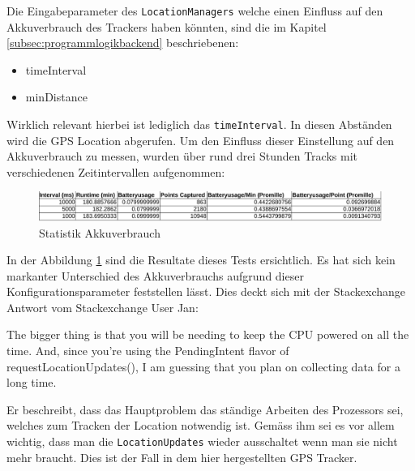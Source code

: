 Die Eingabeparameter des \lstinline$LocationManagers$ welche einen Einfluss auf den Akkuverbrauch des Trackers haben könnten, sind die im Kapitel \ref{subsec:programmlogikbackend} beschriebenen:
\begin{itemize}
	\item timeInterval
	\item minDistance
\end{itemize}

Wirklich relevant hierbei ist lediglich das \lstinline$timeInterval$. In diesen Abständen wird die GPS Location abgerufen. Um den Einfluss dieser Einstellung auf den Akkuverbrauch zu messen, wurden über rund drei Stunden Tracks mit verschiedenen Zeitintervallen aufgenommen:

\begin{figure}[h]
  \centering
  \includegraphics[width=\textwidth]{images/batteryusage.pdf}
  \caption[Statistik Akkuverbrauch]{Statistik Akkuverbrauch}
  \label{fig:batteryusage}
\end{figure}

In der Abbildung \ref{fig:batteryusage} sind die Resultate dieses Tests ersichtlich. Es hat sich kein markanter Unterschied des Akkuverbrauchs aufgrund dieser Konfigurationsparameter feststellen lässt. Dies deckt sich mit der Stackexchange Antwort vom Stackexchange User Jan:

\flqq The bigger thing is that you will be needing to keep the CPU powered on all the time. And, since you're using the PendingIntent flavor of requestLocationUpdates(), I am guessing that you plan on collecting data for a long time.\frqq

Er beschreibt, dass das Hauptproblem das ständige Arbeiten des Prozessors sei, welches zum Tracken der Location notwendig ist. Gemäss ihm sei es vor allem wichtig, dass man die \lstinline$LocationUpdates$ wieder ausschaltet wenn man sie nicht mehr braucht. Dies ist der Fall in dem hier hergestellten GPS Tracker.